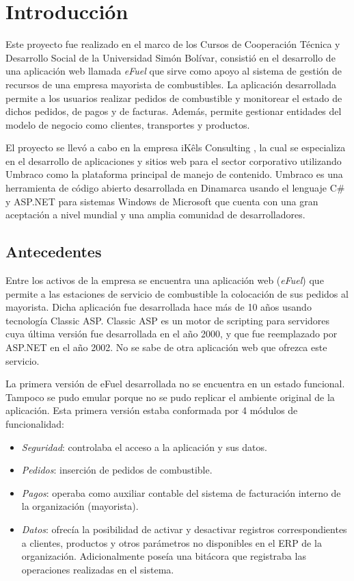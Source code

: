 \chapter*{Introducción}

Este proyecto fue realizado en el marco de los Cursos de Cooperación Técnica y Desarrollo Social de la Universidad Simón Bolívar, consistió en el desarrollo de una aplicación web llamada \emph{eFuel} que sirve como apoyo al sistema de gestión de recursos de una empresa mayorista de combustibles. La aplicación desarrollada permite a los usuarios realizar pedidos de combustible y monitorear el estado de dichos pedidos, de pagos y de facturas. Además, permite gestionar entidades del modelo de negocio como clientes, transportes y productos.

El proyecto se llevó a cabo en la empresa iKêls Consulting \cite{ikelsAbout}, la cual se especializa en el desarrollo de aplicaciones y sitios web para el sector corporativo utilizando Umbraco como la plataforma principal de manejo de  contenido. Umbraco \cite{umbraco} es una herramienta de código abierto desarrollada en Dinamarca usando el lenguaje C\# y ASP.NET para sistemas Windows de Microsoft que cuenta con una gran aceptación a nivel mundial y una amplia comunidad de desarrolladores.

\section*{Antecedentes}
Entre los activos de la empresa se encuentra una aplicación web (\emph{eFuel}) que permite a las estaciones de servicio de combustible la colocación de sus pedidos al mayorista. Dicha aplicación fue desarrollada hace más de 10 años usando tecnología Classic ASP. Classic ASP es un motor de scripting para servidores cuya última versión fue desarrollada en el año 2000, y que fue reemplazado por ASP.NET en el año 2002. No se sabe de otra aplicación web que ofrezca este servicio.

La primera versión de eFuel desarrollada no se encuentra en un estado funcional. Tampoco se pudo emular porque no se pudo replicar el ambiente original de la aplicación. Esta primera versión estaba conformada por 4 módulos de funcionalidad:

\begin{itemize}
    \item \emph{Seguridad}: controlaba el acceso a la aplicación y sus datos.
    \item \emph{Pedidos}: inserción de pedidos de combustible.
    \item \emph{Pagos}: operaba como auxiliar contable del sistema de facturación interno de la organización (mayorista). 
    \item \emph{Datos}: ofrecía la posibilidad de activar y desactivar registros correspondientes a clientes, productos y otros parámetros no disponibles en el \ac{ERP} de la organización. Adicionalmente poseía una bitácora que registraba las operaciones realizadas en el sistema.
\end{itemize}

